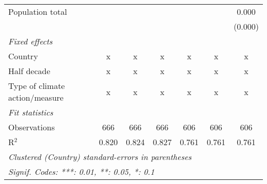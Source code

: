 \begin{tabular}{lcccccc}
   Population total                           &         &               &               &               &               & 0.000\\   
                                              &         &               &               &               &               & (0.000)\\   
   \emph{Fixed effects}\\
   Country                                    & x       & x             & x             & x             & x             & x\\  
   Half decade                                & x       & x             & x             & x             & x             & x\\  
   Type of climate action/measure             & x       & x             & x             & x             & x             & x\\  
   \midrule \emph{Fit statistics}\\
   Observations                               & 666     & 666           & 666           & 606           & 606           & 606\\  
   R$^2$                                      & 0.820   & 0.824         & 0.827         & 0.761         & 0.761         & 0.761\\  
   \midrule
   \multicolumn{7}{l}{\emph{Clustered (Country) standard-errors in parentheses}}\\
   \multicolumn{7}{l}{\emph{Signif. Codes: ***: 0.01, **: 0.05, *: 0.1}}\\
\end{tabular}
\par\endgroup


